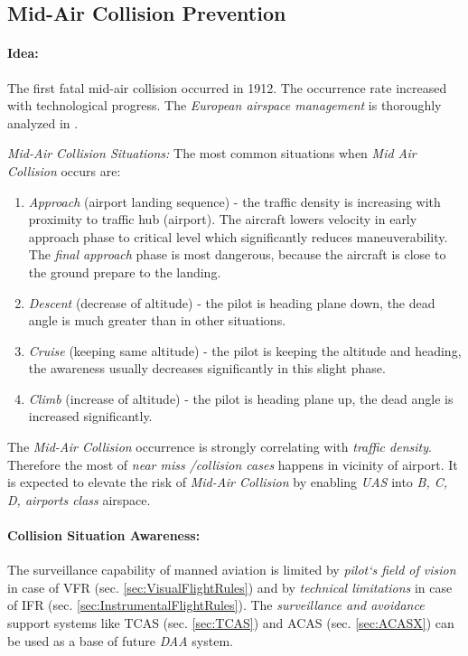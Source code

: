 \subsection{Mid-Air Collision Prevention}\label{sec:MidairCollisionPrevention}
\paragraph{Idea:} The first fatal mid-air collision occurred in 1912. The occurrence rate increased with technological progress. The \emph{European airspace management} is thoroughly analyzed in \cite{cook2007european}. 

\emph{Mid-Air Collision Situations:} The most common situations when \emph{Mid Air Collision} occurs are:

\begin{enumerate}
    \item \emph{Approach} (airport landing sequence) - the traffic density is increasing with proximity to traffic hub (airport). The aircraft lowers velocity in early approach phase to critical level which significantly reduces maneuverability. The \emph{final approach} phase is most dangerous, because the aircraft is close to the ground prepare to the landing.  
    
    \item \emph{Descent} (decrease of altitude) - the pilot is heading plane down, the dead angle is much greater than in other situations.
    
    \item \emph{Cruise}  (keeping same altitude) - the pilot is  keeping the altitude and heading, the awareness usually decreases significantly in this slight phase. 

    \item \emph{Climb} (increase of altitude) - the pilot is heading plane up, the dead angle is increased significantly. 
\end{enumerate}

\begin{note}
    The \emph{Mid-Air Collision} occurrence is strongly correlating with \emph{traffic density}. Therefore the most of \emph{near miss /collision cases} happens in vicinity of airport. It is expected to elevate the risk of \emph{Mid-Air Collision} by enabling \emph{UAS} into \emph{B, C, D, airports class}  airspace.
\end{note}

\paragraph{Collision Situation Awareness:} The surveillance capability of manned aviation is limited by \emph{pilot`s field of vision} in case of VFR (sec. \ref{sec:VisualFlightRules}) and by \emph{technical limitations} in case of IFR (sec. \ref{sec:InstrumentalFlightRules}). The \emph{surveillance and avoidance} support systems like TCAS (sec. \ref{sec:TCAS}) and ACAS (sec. \ref{sec:ACASX}) can be used as a base of future \emph{DAA} system.


